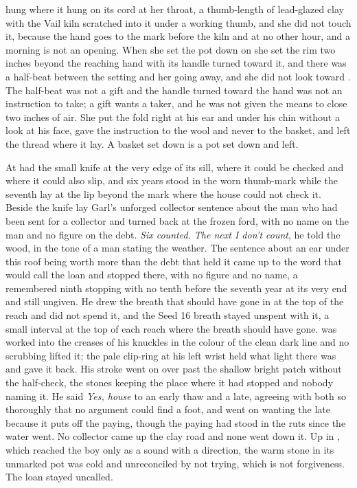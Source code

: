  hung where it hung on its cord at her throat, a thumb-length of lead-glazed clay with the Vail kiln scratched into it under a working thumb, and she did not touch it, because the hand goes to the mark before the kiln and at no other hour, and a morning is not an opening. When she set the pot down on  she set the rim two inches beyond the reaching hand with its handle turned toward it, and there was a half-beat between the setting and her going away, and she did not look toward . The half-beat was not a gift and the handle turned toward the hand was not an instruction to take; a gift wants a taker, and he was not given the means to close two inches of air. She put the fold right at his ear and under his chin without a look at his face, gave the instruction to the wool and never to the basket, and left the thread where it lay. A basket set down is a pot set down and left.

At   had the small knife at the very edge of its sill, where it could be checked and where it could also slip, and six years stood in the worn thumb-mark while the seventh lay at the lip beyond the mark where the house could not check it. Beside the knife lay Garl's unforged collector sentence about the man who had been sent for a collector and turned back at the frozen ford, with no name on the man and no figure on the debt. \emph{Six counted. The next I don't count}, he told the wood, in the tone of a man stating the weather. The sentence about an ear under this roof being worth more than the debt that held it came up to the word that would call the loan and stopped there, with no figure and no name, a remembered ninth stopping with no tenth before the seventh year at its very end and still ungiven. He drew the breath that should have gone in at the top of the reach and did not spend it, and the Seed 16 breath stayed unspent with it, a small interval at the top of each reach where the breath should have gone.  was worked into the creases of his knuckles in the colour of the clean dark line and no scrubbing lifted it; the pale clip-ring at his left wrist held what light there was and gave it back. His stroke went on over  past the shallow bright patch without the half-check, the stones keeping the place where it had stopped and nobody naming it. He said \emph{Yes, house} to an early thaw and a late, agreeing with both so thoroughly that no argument could find a foot, and went on wanting the late because it puts off the paying, though the paying had stood in the ruts since the water went. No collector came up the clay road and none went down it. Up in , which reached the boy only as a sound with a direction, the warm stone in its unmarked pot was cold and unreconciled by not trying, which is not forgiveness. The loan stayed uncalled.

